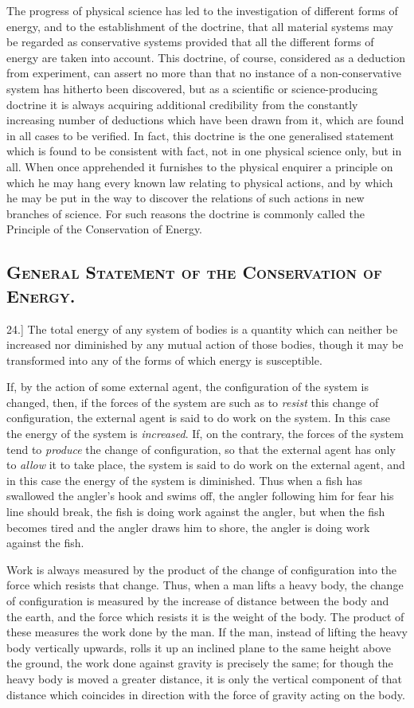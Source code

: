 \documentclass[12pt,oneside]{book}[2021/10/04]
\newcommand{\Heading}{\centering\normalfont}
\newcommand{\Section}[1]{\subsection*{\normalsize\Heading\scshape #1}}
\newcommand{\article}[1]{\phantomsection \label{art:#1}{#1.]}}
\newcommand{\¬}{\hphantom{0}}
\begin{document}
The progress of physical science has led to the investigation of
different forms of energy, and to the establishment of the doctrine,
that all material systems may be regarded as conservative systems
provided that all the different forms of energy are taken into account.
This doctrine, of course, considered as a deduction from experiment,
can assert no more than that no instance of a non-conservative
system has hitherto been discovered, but as a scientific or science-producing
doctrine it is always acquiring additional credibility
from the constantly increasing number of deductions which have
been drawn from it, which are found in all cases to be verified.
In fact, this doctrine is the one generalised statement which is
found to be consistent with fact, not in one physical science only,
but in all. When once apprehended it furnishes to the physical
enquirer a principle on which he may hang every known law
relating to physical actions, and by which he may be put in the
way to discover the relations of such actions in new branches of
science. For such reasons the doctrine is commonly called the
Principle of the Conservation of Energy.

\Section{General Statement of the Conservation of Energy.}

\article{24} The total energy of any system of bodies is a quantity
which can neither be increased nor diminished by any mutual
action of those bodies, though it may be transformed into any of
the forms of which energy is susceptible.

If, by the action of some external agent, the configuration of the
system is changed, then, if the forces of the system are such as to
\textit{resist} this change of configuration, the external agent is said to do
work on the system. In this case the energy of the system is
\textit{increased}. If, on the contrary, the forces of the system tend to
\textit{produce} the change of configuration, so that the external agent has
only to \textit{allow} it to take place, the system is said to do work on
the external agent, and in this case the energy of the system is
diminished. Thus when a fish has swallowed the angler's hook
and swims off, the angler following him for fear his line should
break, the fish is doing work against the angler, but when the fish
becomes tired and the angler draws him to shore, the angler is
doing work against the fish.

Work is always measured by the product of the change of
configuration into the force which resists that change. Thus, when
a man lifts a heavy body, the change of configuration is measured
by the increase of distance between the body and the earth, and
the force which resists it is the weight of the body. The product
of these measures the work done by the man. If the man, instead
of lifting the heavy body vertically upwards, rolls it up an inclined
plane to the same height above the ground, the work done against
gravity is precisely the same; for though the heavy body is moved
a greater distance, it is only the vertical component of that
distance which coincides in direction with the force of gravity
acting on the body.
\end{document}
